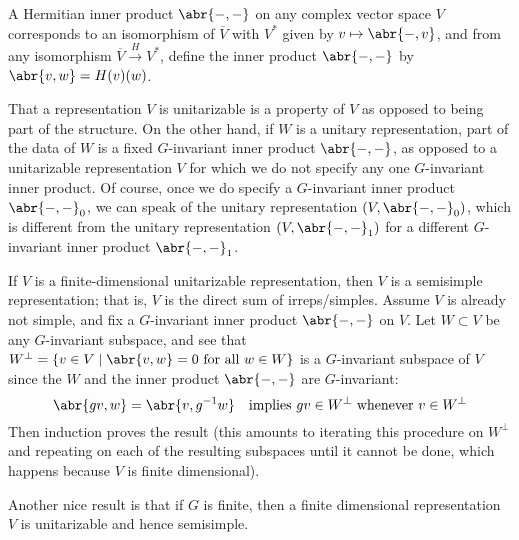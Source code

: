 \documentclass[11pt,leqno]{article}
\theoremstyle{plain}
\theoremstyle{definition}
\numberwithin{equation}{section}
\numberwithin{lem}{section}
\newcommand{\cbr}[1]{\left\{#1\right\}}
\begin{document}
A Hermitian inner product $\abr{-,-}$ on any complex vector space $V$ corresponds to an isomorphism of $\overline V$ with $V^\ast$ given by $v\mapsto \abr{-,v}$, and from any isomorphism $\overline V\xrightarrow{H} V^\ast$, define the inner product $\abr{-,-}$ by $\abr{v,w} = H(v)(w)$.

That a representation $V$ is unitarizable is a property of $V$ as opposed to being part of the structure. On the other hand, if $W$ is a unitary representation, part of the data of $W$ is a fixed $G$-invariant inner product $\abr{-,-}$, as opposed to a unitarizable representation $V$ for which we do not specify any one $G$-invariant inner product. Of course, once we do specify a $G$-invariant inner product $\abr{-,-}_0$, we can speak of the unitary representation $(V,\abr{-,-}_0)$, which is different from the unitary representation $(V,\abr{-,-}_1)$ for a different $G$-invariant inner product $\abr{-,-}_1$.

If $V$ is a finite-dimensional unitarizable representation, then $V$ is a semisimple representation; that is, $V$ is the direct sum of irreps/simples. Assume $V$ is already not simple, and fix a $G$-invariant inner product $\abr{-,-}$ on $V$. Let $W\subset V$ be any $G$-invariant subspace, and see that $W^\perp = \cbr{v\in V\mid \abr{v,w} = 0\text{ for all }w\in W}$ is a $G$-invariant subspace of $V$ since the $W$ and the inner product $\abr{-,-}$ are $G$-invariant:
\[\abr{gv,w} = \abr{v,g^{-1}w}\quad\text{implies $gv\in W^\perp$ whenever $v\in W^\perp$}\]
Then induction proves the result (this amounts to iterating this procedure on $W^\perp$ and repeating on each of the resulting subspaces until it cannot be done, which happens because $V$ is finite dimensional).

Another nice result is that if $G$ is finite, then a finite dimensional representation $V$ is unitarizable and hence semisimple.


\newpage
\begin{bibdiv}
\begin{biblist}




\end{biblist}
\end{bibdiv}
\end{document}
